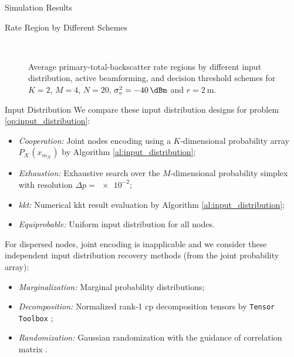 \documentclass[journal]{IEEEtran}
\begin{document}
\begin{section}{Simulation Results}
	\begin{subsection}{Rate Region by Different Schemes}
		\begin{figure}[!t]
			\centering
			\subfloat[Input Distribution, $Q=1$\label{fg:region_distribution}]{
				\resizebox{0.6\columnwidth}{!}{
					
				}
			}
			\\
			\subfloat[Active Beamforming, $Q=4$\label{fg:region_beamforming}]{
				\resizebox{0.48\columnwidth}{!}{
					
				}
			}
			\subfloat[Decision Threshold, $Q=4$\label{fg:region_threshold}]{
				\resizebox{0.48\columnwidth}{!}{
					
				}
			}
			\caption{
				Average primary-total-backscatter rate regions by different input distribution, active beamforming, and decision threshold schemes for $K=2$, $M=4$, $N=20$, $\sigma_v^2=\qty{-40}{\dBm}$ and $r=\qty{2}{\meter}$.
			}
		\end{figure}
		\begin{subsubsection}{Input Distribution}
			We compare these input distribution designs for problem \eqref{op:input_distribution}:
			\begin{itemize}
				\item \emph{Cooperation:} Joint nodes encoding using a $K$-dimensional probability array $P_{\mathcal{K}}(x_{m_{\mathcal{K}}})$ by Algorithm \ref{al:input_distribution};
				\item \emph{Exhaustion:} Exhaustive search over the $M$-dimensional probability simplex with resolution $\Delta p = \num{e-2}$;
				\item \emph{\gls{kkt}:} Numerical \gls{kkt} result evaluation by Algorithm \ref{al:input_distribution};
				\item \emph{Equiprobable:} Uniform input distribution for all nodes.
			\end{itemize}
			For dispersed nodes, joint encoding is inapplicable and we consider these independent input distribution recovery methods (from the joint probability array):
			\begin{itemize}
				\item \emph{Marginalization:} Marginal probability distributions;
				\item \emph{Decomposition:} Normalized rank-\num{1} \gls{cp} decomposition tensors by \texttt{Tensor Toolbox} \cite{Bader2022};
				\item \emph{Randomization:} Gaussian randomization with the guidance of correlation matrix \cite{Calvo2010}.
			\end{itemize}


\end{subsubsection}
\end{subsection}
\end{section}
\end{document}
